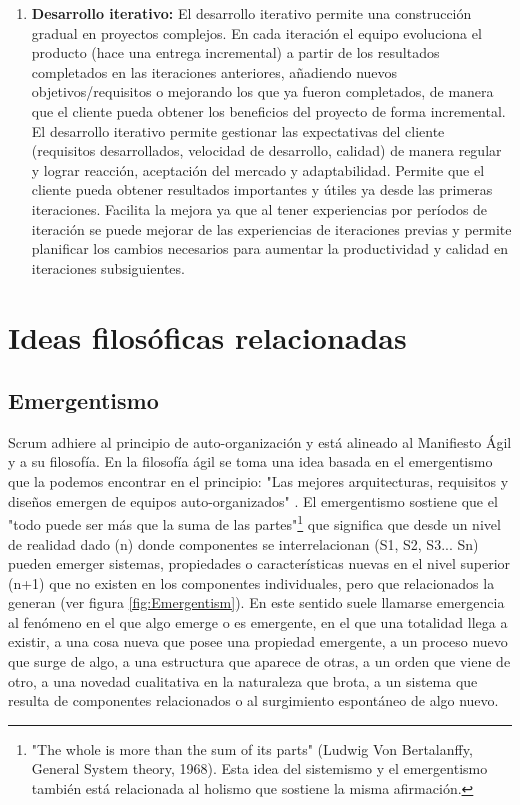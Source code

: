 \begin{enumerate}
\item \textbf{Desarrollo iterativo:} El desarrollo iterativo permite una construcción gradual en proyectos complejos. En cada iteración el equipo evoluciona el producto (hace una entrega incremental) a partir de los resultados completados en las iteraciones anteriores, añadiendo nuevos objetivos/requisitos o mejorando los que ya fueron completados, de manera que el cliente pueda obtener los beneficios del proyecto de forma incremental. El desarrollo iterativo permite gestionar las expectativas del cliente (requisitos desarrollados, velocidad de desarrollo, calidad) de manera regular y lograr reacción, aceptación del mercado y adaptabilidad. Permite que el cliente pueda obtener resultados importantes y útiles ya desde las primeras iteraciones. Facilita la mejora ya que al tener experiencias por períodos de iteración se puede mejorar de las experiencias de iteraciones previas y permite planificar los cambios necesarios para aumentar la productividad y calidad en iteraciones subsiguientes.

\end{enumerate}

\section{Ideas filosóficas relacionadas}

\subsection{Emergentismo}

Scrum adhiere al principio de auto-organización y está alineado al Manifiesto Ágil y a su filosofía. En la filosofía ágil se toma una idea basada en el emergentismo que la podemos encontrar en el principio: "Las mejores arquitecturas, requisitos y diseños emergen de equipos auto-organizados" \cite{Beck-2001}. El emergentismo sostiene que el "todo puede ser más que la suma de las partes"\footnote{"The whole is more than the sum of its parts" (Ludwig Von Bertalanffy, General System theory, 1968). Esta idea del sistemismo y el emergentismo también está relacionada al holismo que sostiene la misma afirmación.} que significa que desde un nivel de realidad dado (n) donde componentes se interrelacionan (S1, S2, S3... Sn) pueden emerger sistemas, propiedades o características nuevas en el nivel superior (n+1) que no existen en los componentes individuales, pero que relacionados la generan (ver figura \ref{fig:Emergentism}). En este sentido suele llamarse emergencia al fenómeno en el que algo emerge o es emergente, en el que una totalidad llega a existir, a una cosa nueva que posee una propiedad emergente, a un proceso nuevo que surge de algo, a una estructura que aparece de otras, a un orden que viene de otro, a una novedad cualitativa en la naturaleza que brota, a un sistema que resulta de componentes relacionados o al surgimiento espontáneo de algo nuevo.

